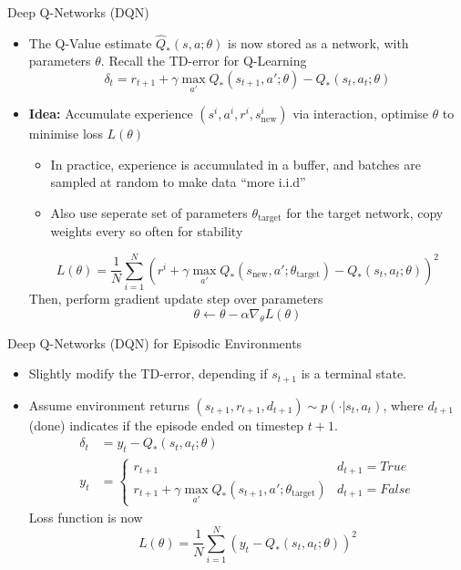 \documentclass[10pt,a4paper]{beamer}
\begin{document}
\begin{frame}{Deep Q-Networks (DQN)}
	\begin{itemize}
		\item The Q-Value estimate $\hat{Q}_*(s,a;\theta)$ 
		is now stored as a network, with parameters $\theta$.
		Recall the TD-error for Q-Learning
		$$
		\delta_t = r_{t+1} + \gamma \max_{a'} Q_{*}(s_{t+1}, a'; \theta) 
		- Q_{*}(s_t, a_t;\theta)
		$$
		\pause
		\item \textbf{Idea:} Accumulate experience 
		$(s^i,a^i,r^i,s_{\text{new}}^i)$ via interaction, optimise
		$\theta$ to minimise loss $L(\theta)$
		\pause
		\begin{itemize}
			\item In practice, experience is accumulated in a buffer, and batches
			are sampled at random to make data ``more i.i.d''
			\pause
			\item Also use seperate set of parameters $\theta_{\text{target}}$ 
			for the target network, copy weights every so often for stability
		\end{itemize}
		\pause
		$$
		L(\theta) = \frac{1}{N}\sum_{i=1}^{N} 
		\left(
		r^i + \gamma \max_{a'} Q_{*}(s_\text{new}, a'; \theta_{\text{target}} ) -  Q_{*}(s_t, a_t; \theta)
		\right)^2
		$$  
		\pause
		Then, perform gradient update step over parameters
		$$
		\theta \leftarrow \theta - \alpha \nabla_\theta L(\theta)
		$$
	\end{itemize}
\end{frame}

\begin{frame}{Deep Q-Networks (DQN) for Episodic Environments}
	\begin{itemize}
		\item Slightly modify the TD-error, depending if $s_{t+1}$ 
		is a terminal state.
		\item Assume environment returns $(s_{t+1}, r_{t+1}, d_{t+1}) \sim p(\cdot | s_t, a_t)$,
		where $d_{t+1}$ (done) indicates if the episode ended on timestep $t+1$.
		\begin{align*}
			\delta_t &= y_t - Q_{*}(s_t, a_t;\theta) \\
		y_t &= \begin{cases}
			r_{t+1} & d_{t+1} = True \\
			r_{t+1} + \gamma \max_{a'} Q_{*}(s_{t+1}, a'; \theta_{\text{target}}) & d_{t+1} = False 
		\end{cases} 
		\end{align*}
		\pause
		Loss function is now
		$$
		L(\theta) = \frac{1}{N} \sum_{i=1}^N \left(y_t - Q_*(s_t,a_t; \theta )\right)^2
		$$
		\end{itemize}
\end{frame}
\end{document}
